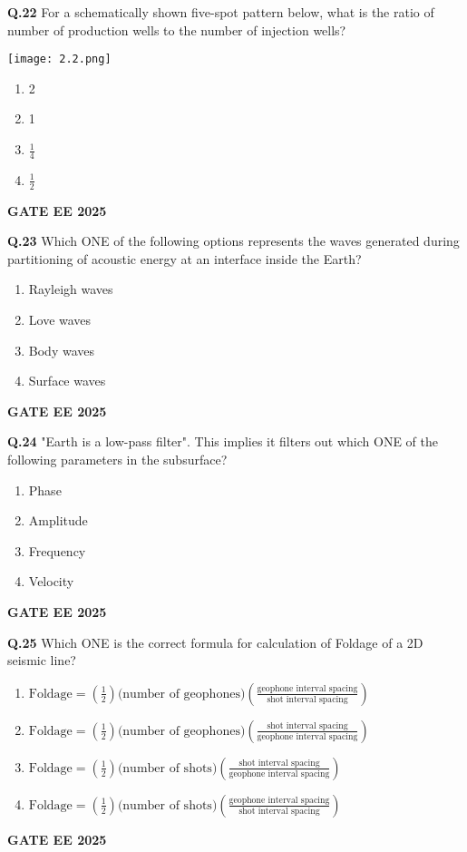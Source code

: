 \documentclass{article}
\begin{document}
\vspace{0.5cm}

\textbf{Q.22} For a schematically shown five-spot pattern below, what is the ratio of number of production wells to the number of injection wells?

\texttt{[image: 2.2.png]}

\begin{enumerate}[label=(\Alph*)]
    \item 2
    \item 1
    \item $\frac{1}{4}$
    \item $\frac{1}{2}$
\end{enumerate}
\textbf{GATE EE 2025}

\vspace{0.5cm}

\textbf{Q.23} Which ONE of the following options represents the waves generated during partitioning of acoustic energy at an interface inside the Earth?
\begin{enumerate}[label=(\Alph*)]
    \item Rayleigh waves
    \item Love waves
    \item Body waves
    \item Surface waves
\end{enumerate}
\textbf{GATE EE 2025}

\vspace{0.5cm}

\textbf{Q.24} "Earth is a low-pass filter". This implies it filters out which ONE of the following parameters in the subsurface?
\begin{enumerate}[label=(\Alph*)]
    \item Phase
    \item Amplitude
    \item Frequency
    \item Velocity
\end{enumerate}
\textbf{GATE EE 2025}

\vspace{0.5cm}

\textbf{Q.25} Which ONE is the correct formula for calculation of Foldage of a 2D seismic line?
\begin{enumerate}[label=(\Alph*)]
    \item $\text{Foldage} = \left(\frac{1}{2}\right) \text{(number of geophones)} \left(\frac{\text{geophone interval spacing}}{\text{shot interval spacing}}\right)$
    \item $\text{Foldage} = \left(\frac{1}{2}\right) \text{(number of geophones)} \left(\frac{\text{shot interval spacing}}{\text{geophone interval spacing}}\right)$
    \item $\text{Foldage} = \left(\frac{1}{2}\right) \text{(number of shots)} \left(\frac{\text{shot interval spacing}}{\text{geophone interval spacing}}\right)$
    \item $\text{Foldage} = \left(\frac{1}{2}\right) \text{(number of shots)} \left(\frac{\text{geophone interval spacing}}{\text{shot interval spacing}}\right)$
\end{enumerate}
\textbf{GATE EE 2025}
\end{document}
